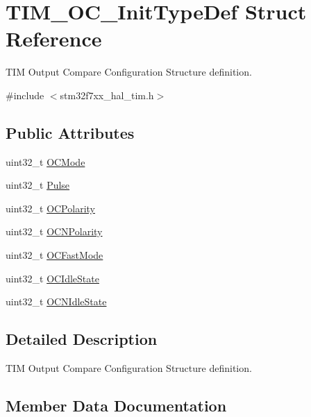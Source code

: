 \hypertarget{struct_t_i_m___o_c___init_type_def}{}\section{T\+I\+M\+\_\+\+O\+C\+\_\+\+Init\+Type\+Def Struct Reference}
\label{struct_t_i_m___o_c___init_type_def}


T\+IM Output Compare Configuration Structure definition.  




{\ttfamily \#include $<$stm32f7xx\+\_\+hal\+\_\+tim.\+h$>$}

\subsection*{Public Attributes}
\begin{DoxyCompactItemize}
\item 
uint32\+\_\+t \mbox{\hyperlink{struct_t_i_m___o_c___init_type_def_ae5faa1cba0b3f1ab6179cc54e1015ee8}{O\+C\+Mode}}
\item 
uint32\+\_\+t \mbox{\hyperlink{struct_t_i_m___o_c___init_type_def_a61fb5b9ef4154de67620ac81085a0e39}{Pulse}}
\item 
uint32\+\_\+t \mbox{\hyperlink{struct_t_i_m___o_c___init_type_def_a556b7137d041aceed3e45c87cbfb39cd}{O\+C\+Polarity}}
\item 
uint32\+\_\+t \mbox{\hyperlink{struct_t_i_m___o_c___init_type_def_a21922d8e2fee659d081c4be4c500d1d4}{O\+C\+N\+Polarity}}
\item 
uint32\+\_\+t \mbox{\hyperlink{struct_t_i_m___o_c___init_type_def_a4c4203c5ed779ac86fb793bb9d628e55}{O\+C\+Fast\+Mode}}
\item 
uint32\+\_\+t \mbox{\hyperlink{struct_t_i_m___o_c___init_type_def_ace3e2b76ca2fca0f4961585ed9ebecf5}{O\+C\+Idle\+State}}
\item 
uint32\+\_\+t \mbox{\hyperlink{struct_t_i_m___o_c___init_type_def_a0d70cc51990d7433fd76cc6ed1d06237}{O\+C\+N\+Idle\+State}}
\end{DoxyCompactItemize}


\subsection{Detailed Description}
T\+IM Output Compare Configuration Structure definition. 

\subsection{Member Data Documentation}
\mbox{\label{struct_t_i_m___o_c___init_type_def_a4c4203c5ed779ac86fb793bb9d628e55}} 
